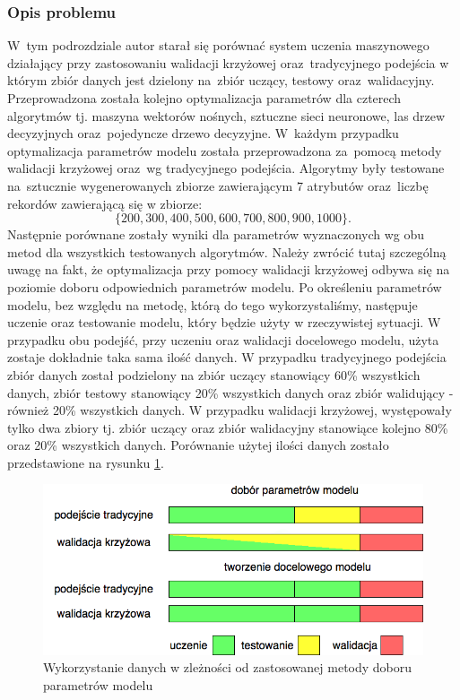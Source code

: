 \subsubsection{Opis problemu}
W~tym podrozdziale autor starał się porównać system uczenia maszynowego działający przy zastosowaniu walidacji krzyżowej oraz~tradycyjnego podejścia w którym zbiór danych jest dzielony na~zbiór uczący, testowy oraz~walidacyjny. Przeprowadzona została kolejno optymalizacja parametrów dla czterech algorytmów tj. maszyna wektorów nośnych, sztuczne sieci neuronowe, las drzew decyzyjnych oraz~pojedyncze drzewo decyzyjne. W~każdym przypadku optymalizacja parametrów modelu została przeprowadzona za~pomocą metody walidacji krzyżowej oraz~wg tradycyjnego podejścia.  Algorytmy były testowane na~sztucznie wygenerowanych zbiorze zawierającym 7 atrybutów oraz~liczbę rekordów zawierającą się w zbiorze:
\begin{equation*}
\{200, 300, 400, 500, 600, 700, 800, 900, 1000\}. 
\end{equation*}
Następnie porównane zostały wyniki dla parametrów wyznaczonych wg obu metod dla wszystkich testowanych algorytmów. Należy zwrócić tutaj szczególną uwagę na fakt, że optymalizacja przy pomocy walidacji krzyżowej odbywa się na poziomie doboru odpowiednich parametrów modelu. Po określeniu parametrów modelu, bez względu na metodę, którą do tego wykorzystaliśmy, następuje uczenie oraz testowanie modelu, który będzie użyty w rzeczywistej sytuacji. W przypadku obu podejść, przy uczeniu oraz walidacji docelowego modelu, użyta zostaje dokładnie taka sama ilość danych. W przypadku tradycyjnego podejścia zbiór danych został podzielony na zbiór uczący stanowiący 60\% wszystkich danych, zbiór testowy stanowiący 20\% wszystkich danych oraz zbiór walidujący - również 20\% wszystkich danych. W przypadku walidacji krzyżowej, występowały tylko dwa zbiory tj. zbiór uczący oraz zbiór walidacyjny stanowiące kolejno 80\% oraz 20\% wszystkich danych. Porównanie użytej ilości danych zostało przedstawione na rysunku \ref{cvdata}.

\begin{figure}[ht!]
\centering
\includegraphics[scale=0.6]{res/cvdata.png}
\caption[Caption for LOF]{Wykorzystanie danych w zleżności od zastosowanej metody doboru parametrów modelu\label{cvdata}}
\end{figure} 

